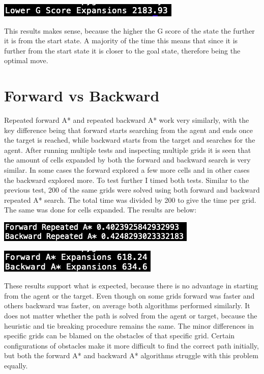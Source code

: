 \documentclass[12pt]{article}
\begin{document}
\begin{center}
\includegraphics{lowerGScoreExp.png}
\end{center}
This results makes sense, because the higher the G score of the state the further it is from the start state. A majority of the time this means that since it is further from the start state it is closer to the goal state, therefore being the optimal move.\\

\section{Forward vs Backward}

Repeated forward A* and repeated backward A* work very similarly, with the key difference being that forward starts searching from the agent and ends once the target is reached, while backward starts from the target and searches for the agent. After running multiple tests and inspecting multiple grids it is seen that the amount of cells expanded by both the forward and backward search is very similar. In some cases the forward explored a few more cells and in other cases the backward explored more. To test further I timed both tests. Similar to the previous test, 200 of the same grids were solved using both forward and backward repeated A* search. The total time was divided by 200 to give the time per grid. The same was done for cells expanded. The results are below:\\

\begin{center}
\includegraphics{forwardBackward.png}
\end{center}

\begin{center}
\includegraphics{forwardBackwardExp.png}
\end{center}
These results support what is expected, because there is no advantage in starting from the agent or the target. Even though on some grids forward was faster and others backward was faster, on average both algorithms performed similarly. It does not matter whether the path is solved from the agent or target, because the heuristic and tie breaking procedure remains the same. The minor differences in specific grids can be blamed on the obstacles of that specific grid. Certain configurations of obstacles make it more difficult to find the correct path initially, but both the forward A* and backward A* algorithms struggle with this problem equally.\\
\end{document}
